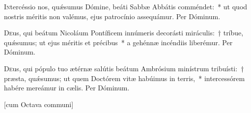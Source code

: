 \documentclass[vesperale_romanum.tex]{subfiles}
\begin{document}

\myrule



\oratio

\lettrine{I}{n}tercéssio nos, quǽsumus Dómine, beáti Sabbæ Abbátis comméndet:~* ut quod nostris méritis non valémus, ejus patrocínio assequámur. Per Dóminum.

\myrule


\duplex

\oratio

\lettrine{D}{e}us, qui beátum Nicoláum Pontíficem innúmeris decorásti miráculis:~† tríbue, quǽsumus; ut ejus méritis et précibus~* a gehénnæ incéndiis liberémur. Per Dóminum.

\myrule


\duplexmtv


\oratio

\lettrine{D}{e}us, qui pópulo tuo ætérnæ salútis beátum Ambrósium minístrum tribuísti:~† præsta, quǽsumus; ut quem Doctórem vitæ habúimus in terris,~* intercessórem habére mereámur in cælis. Per Dóminum.





\myrule


\thispagestyle{empty}
\label{8_decembris}

[cum Octava communi]
\end{document}
